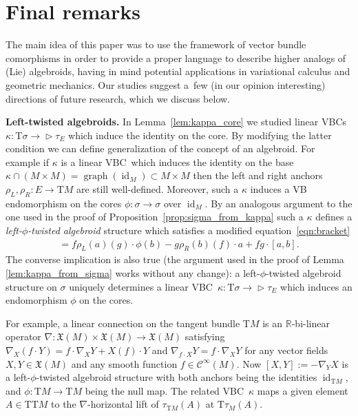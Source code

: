 \documentclass[pdftex]{sigma}
\newcommand{\ZM}{{VBC}} %
\newcommand{\Zakrzewski}{{vector bundle comorphism}}
\newcommand{\R}{\mathbb{R}}
\newcommand{\graf}{\operatorname{graph}}
\newcommand{\id}{\operatorname{id}}
\newcommand{\X}{\mathfrak{X}}
\newcommand{\ra}{\rightarrow}
\newcommand{\rhoL}{\rho_L} %
\newcommand{\rhoR}{\rho_R}
\newcommand{\T}{\mathrm{T}} %
\newcommand{\Cf}{\mathcal{C}^\infty}
\def\relto{\rightarrow\!\!\vartriangleright} %
\numberwithin{equation}{section}
\theoremstyle{definition}
\begin{document}
\section{Final remarks}\label{sec:final}
The main idea of this paper was to use the framework of \Zakrzewski s in order to provide a proper language to describe higher analogs of (Lie) algebroids, having in mind potential applications in variational calculus and geometric mechanics. Our studies suggest a~few (in our opinion interesting) directions of future research, which we discuss below.

{\bf Left-twisted algebroids.} In Lemma~\ref{lem:kappa_core} we studied linear \ZM s $\kappa\colon \T\sigma\relto \tau_E$ which induce the identity on the core. By modifying the latter condition we can define generalization of the concept of an algebroid. For example if $\kappa$ is a linear \ZM\ which induces the identity on the base $\kappa\cap(M\times M)=\graf(\id_M)\subset M\times M$ then the left and right anchors $\rhoL,\rhoR\colon E\ra \T M$ are still well-defined. Moreover, such a $\kappa$ induces a VB endomorphism on the cores $\phi\colon \sigma\ra \sigma$ over $\id_M$. By an analogous argument to the one used in the proof of Proposition~\ref{prop:sigma_from_kappa} such a $\kappa$ defines a \emph{left-$\phi$-twisted algebroid} structure which satisfies a modified equation~\eqref{eqn:bracket}
\begin{gather*}[f\cdot a,g\cdot b]=f\rhoL(a)(g)\cdot\phi(b)-g\rhoR(b)(f)\cdot a+fg\cdot[a,b].\end{gather*}
The converse implication is also true (the argument used in the proof of Lemma \ref{lem:kappa_from_sigma} works without any change): a left-$\phi$-twisted algebroid structure on $\sigma$ uniquely determines a linear \ZM\ $\kappa\colon \T\sigma\relto \tau_E$ which induces an endomorphism $\phi$ on the cores.

For example, a linear connection on the tangent bundle $\T M$ is an $\R$-bi-linear operator $\nabla\colon \X(M)\times\X(M)\ra \X(M)$ satisfying $\nabla_X(f\cdot Y)=f\cdot\nabla_XY+X(f)\cdot Y$ and $\nabla_{f\cdot X}Y=f\cdot\nabla_X Y$ for any vector fields $X,Y\in\X(M)$ and any smooth function $f\in\Cf(M)$. Now $[X,Y]:=-\nabla_YX$ is a left-$\phi$-twisted algebroid structure with both anchors being the identities $\id_{\T M}${,} and $\phi\colon \T M\ra\T M$ being the null map. The related \ZM\ $\kappa$ maps a given element $A\in \T\T M$ to the $\nabla$-horizontal lift of $\tau_{\T M}(A)$ at $\T\tau_M(A)$.
\end{document}
